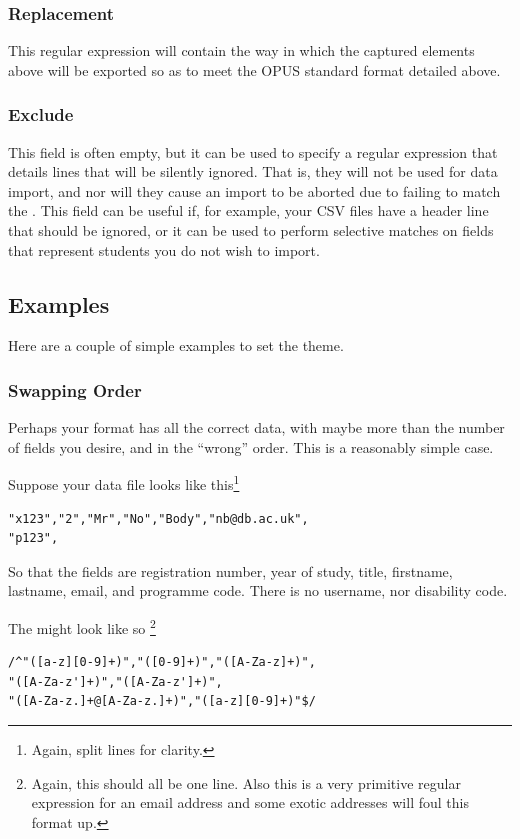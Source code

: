 \documentclass[12 pt]{book}
\begin{document}
\subsubsection{Replacement}

This regular expression will contain the way in which the captured elements
above will be exported so as to meet the OPUS standard format detailed above.

\subsubsection{Exclude}

This field is often empty, but it can be used to specify a regular expression
that details lines that will be silently ignored. That is, they will not be
used for data import, and nor will they cause an import to be aborted due to
failing to match the . This field can be useful if, for 
example, your CSV files have a header line that should be ignored, or it can
be used to perform selective matches on fields that represent students you
do not wish to import.

\subsection{Examples}

Here are a couple of simple examples to set the theme.

\subsubsection{Swapping Order}

Perhaps your format has all the correct data, with maybe more than the
number of fields you desire, and in the ``wrong'' order. This is a reasonably
simple case.

Suppose your data file looks like this\footnote{Again, split lines for clarity.}
\begin{lstlisting}
"x123","2","Mr","No","Body","nb@db.ac.uk",
"p123",
\end{lstlisting}

So that the fields are registration number, year of study, title, firstname,
lastname, email, and programme code. There is no username, nor disability code.

The  might look like so%
\footnote{Again, this should all be one line. Also this is a very primitive
regular expression for an email address and some exotic addresses will foul
this format up.}
\begin{lstlisting}
/^"([a-z][0-9]+)","([0-9]+)","([A-Za-z]+)",
"([A-Za-z']+)","([A-Za-z']+)",
"([A-Za-z.]+@[A-Za-z.]+)","([a-z][0-9]+)"$/
\end{lstlisting}
\end{document}
